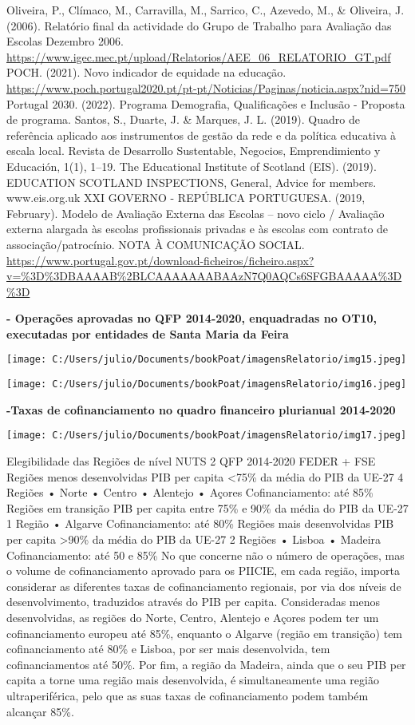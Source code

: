 \documentclass[
]{book}
\begin{document}
Oliveira, P., Clímaco, M., Carravilla, M., Sarrico, C., Azevedo, M., \& Oliveira, J. (2006). Relatório final da actividade do Grupo de Trabalho para Avaliação das Escolas Dezembro 2006. \url{https://www.igec.mec.pt/upload/Relatorios/AEE_06_RELATORIO_GT.pdf}
POCH. (2021). Novo indicador de equidade na educação. \url{https://www.poch.portugal2020.pt/pt-pt/Noticias/Paginas/noticia.aspx?nid=750}
Portugal 2030. (2022). Programa Demografia, Qualificações e Inclusão - Proposta de programa.
Santos, S., Duarte, J. \& Marques, J. L. (2019). Quadro de referência aplicado aos instrumentos de gestão da rede e da política educativa à escala local. Revista de Desarrollo Sustentable, Negocios, Emprendimiento y Educación, 1(1), 1--19.
The Educational Institute of Scotland (EIS). (2019). EDUCATION SCOTLAND INSPECTIONS, General, Advice for members. www.eis.org.uk
XXI GOVERNO - REPÚBLICA PORTUGUESA. (2019, February). Modelo de Avaliação Externa das Escolas -- novo ciclo / Avaliação externa alargada às escolas profissionais privadas e às escolas com contrato de associação/patrocínio. NOTA À COMUNICAÇÃO SOCIAL. \url{https://www.portugal.gov.pt/download-ficheiros/ficheiro.aspx?v=\%3D\%3DBAAAAB\%2BLCAAAAAAABAAzN7Q0AQCs6SFGBAAAAA\%3D\%3D}

\textbf{\textbar{} - Operações aprovadas no QFP 2014-2020, enquadradas no OT10, executadas por entidades de Santa Maria da Feira }

\texttt{[image: C:/Users/julio/Documents/bookPoat/imagensRelatorio/img15.jpeg]}

\texttt{[image: C:/Users/julio/Documents/bookPoat/imagensRelatorio/img16.jpeg]}

\textbf{\textbar\textbar{} -Taxas de cofinanciamento no quadro financeiro plurianual 2014-2020}

\texttt{[image: C:/Users/julio/Documents/bookPoat/imagensRelatorio/img17.jpeg]}

Elegibilidade das Regiões de nível NUTS 2 QFP 2014-2020
FEDER + FSE
Regiões menos desenvolvidas
PIB per capita \textless75\% da média do PIB da UE-27 4 Regiões
• Norte
• Centro
• Alentejo
• Açores
Cofinanciamento: até 85\%
Regiões em transição
PIB per capita entre 75\% e 90\% da média do PIB da UE-27 1 Região
• Algarve
Cofinanciamento: até 80\%
Regiões mais desenvolvidas
PIB per capita \textgreater90\% da média do PIB da UE-27 2 Regiões
• Lisboa
• Madeira
Cofinanciamento: até 50 e 85\%
No que concerne não o número de operações, mas o volume de cofinanciamento aprovado para os PIICIE, em cada região, importa considerar as diferentes taxas de cofinanciamento regionais, por via dos níveis de desenvolvimento, traduzidos através do PIB per capita. Consideradas menos desenvolvidas, as regiões do Norte, Centro, Alentejo e Açores podem ter um cofinanciamento europeu até 85\%, enquanto o Algarve (região em transição) tem cofinanciamento até 80\% e Lisboa, por ser mais desenvolvida, tem cofinanciamentos até 50\%. Por fim, a região da Madeira, ainda que o seu PIB per capita a torne uma região mais desenvolvida, é simultaneamente uma região ultraperiférica, pelo que as suas taxas de cofinanciamento podem também alcançar 85\%.
\end{document}
